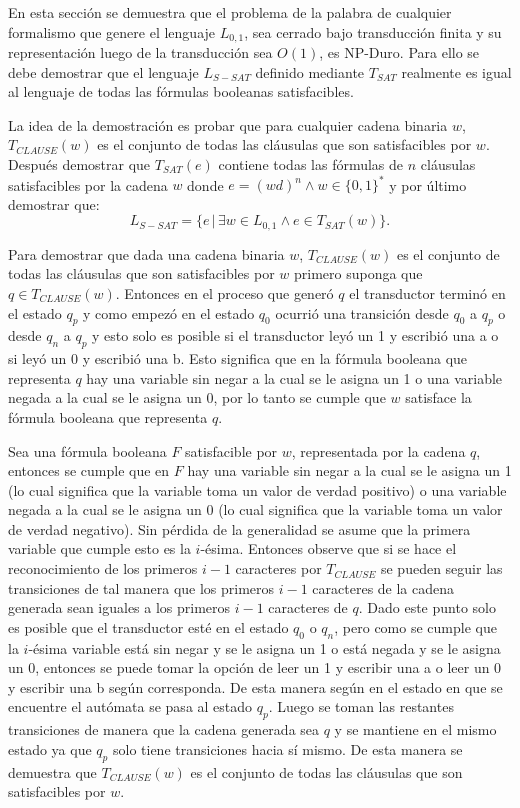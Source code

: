 En esta sección se demuestra que el problema de la palabra de cualquier formalismo que genere el lenguaje 
$L_{0,1}$, sea cerrado bajo transducción finita y su representación luego de la transducción sea $O(1)$, es NP-Duro. Para ello se debe demostrar que el lenguaje 
$L_{S-SAT}$ definido mediante $T_{SAT}$ realmente es igual al lenguaje de todas las fórmulas booleanas satisfacibles.

La idea de la demostración es probar que para cualquier cadena binaria $w$, $T_{CLAUSE}(w)$ es el conjunto de todas las cláusulas que son satisfacibles por $w$.
Después demostrar que $T_{SAT}(e)$ contiene todas las fórmulas de $n$ cláusulas satisfacibles por la cadena $w$ donde $e=(wd)^n \wedge w\in\{0,1\}^*$ y por último demostrar que:
$$L_{S-SAT} = \{e\,|\,\exists w \in L_{0,1} \wedge e \in T_{SAT}(w) \}.$$

Para demostrar que dada una cadena binaria $w$, $T_{CLAUSE}(w)$ es el conjunto de todas las cláusulas que son 
satisfacibles por $w$ primero suponga que $q\in T_{CLAUSE}(w)$. Entonces en el proceso que generó $q$ el 
transductor terminó en el estado $q_p$ y como empezó en el estado $q_0$ ocurrió una transición desde $q_0$
a $q_p$ o desde $q_n$ a $q_p$ y esto solo es posible si el transductor leyó un 1 y escribió una a o si leyó un 
0 y escribió una b. Esto significa que en la fórmula booleana que representa $q$ hay una variable sin negar a 
la cual se le asigna un 1 o una variable negada a la cual se le asigna un 0, por lo tanto se cumple que $w$
satisface la fórmula booleana que representa $q$.

Sea una fórmula booleana $F$ satisfacible por $w$, representada por la cadena $q$, entonces se cumple que en 
$F$ hay una variable sin negar a la cual se le asigna un 1 (lo cual significa que la variable toma
un valor de verdad positivo) o una variable 
negada a la cual se le asigna un 0 (lo cual significa que la variable toma
un valor de verdad negativo). Sin pérdida de la generalidad se asume que la primera variable que cumple esto es la $i$-ésima.  
Entonces observe que si se hace el reconocimiento de los primeros $i-1$ caracteres por $T_{CLAUSE}$ se pueden 
seguir las transiciones de tal manera que los primeros $i-1$ caracteres de la cadena generada sean iguales a 
los primeros $i-1$ caracteres de $q$. Dado este punto solo es posible que el transductor esté en el estado 
$q_0$ o $q_n$, pero como se cumple que la $i$-ésima variable está sin negar y se le asigna un 1 o está negada 
y se le asigna un 0, entonces se puede tomar la opción de leer un 1 y escribir una a o leer un 0 y escribir 
una b según corresponda. De esta manera según en el estado en que se encuentre el autómata se pasa al estado $q_p$. 
Luego se toman las restantes transiciones de manera que la cadena generada sea $q$ y se mantiene en el mismo estado ya que $q_p$ solo tiene transiciones hacia sí mismo. De esta manera se demuestra que $T_{CLAUSE}(w)$ es el conjunto de todas las cláusulas que son satisfacibles por $w$.

